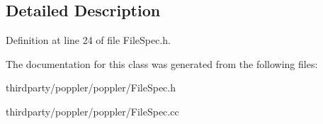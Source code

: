 \subsection{Detailed Description}


Definition at line 24 of file File\+Spec.\+h.



The documentation for this class was generated from the following files\+:\begin{DoxyCompactItemize}
\item 
thirdparty/poppler/poppler/File\+Spec.\+h\item 
thirdparty/poppler/poppler/File\+Spec.\+cc\end{DoxyCompactItemize}
